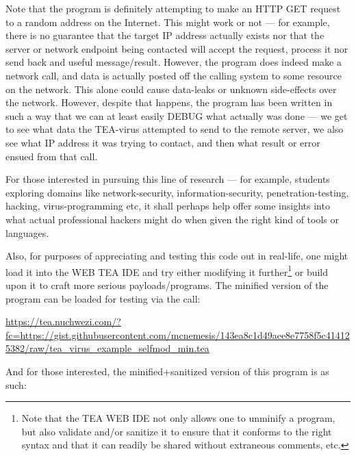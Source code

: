 \documentclass[a4paper, 18pt]{book} %
\begin{document}
Note that the program is definitely attempting to make an HTTP GET request to a random address on the Internet. This might work or not --- for example, there is no guarantee that the target IP address actually exists nor that the server or network endpoint being contacted will accept the request, process it nor send back and useful message/result. However, the program does indeed make a network call, and data is actually posted off the calling system to some resource on the network. This alone could cause data-leaks or unknown side-effects over the network. However, despite that happens, the program has been written in such a way that we can at least easily DEBUG what actually was done --- we get to see what data the TEA-virus attempted to send to the remote server, we also see what IP address it was trying to contact, and then what result or error ensued from that call.

\vspace{1em}

For those interested in pursuing this line of research --- for example, students exploring domains like network-security, information-security, penetration-testing, hacking, virus-programming etc, it shall perhaps help offer some insights into what actual professional hackers might do when given the right kind of tools or languages.

\vspace{1em}

Also, for purposes of appreciating and testing this code out in real-life, one might load it into the WEB TEA IDE and try either modifying it further\footnote{Note that the TEA WEB IDE not only allows one to unminify a program, but also validate and/or sanitize it to ensure that it conforms to the right syntax and that it can readily be shared without extraneous comments, etc.} or build upon it to craft more serious payloads/programs. The minified version of the program can be loaded for testing via the call:


\vspace{1em}

 \url{https://tea.nuchwezi.com/?fc=https://gist.githubusercontent.com/mcnemesis/143ea8c1d49aee8e7758f5c414125382/raw/tea_virus_example_selfmod_min.tea}

\vspace{1em}



And for those interested, the minified+sanitized version of this program is as such:
\end{document}
